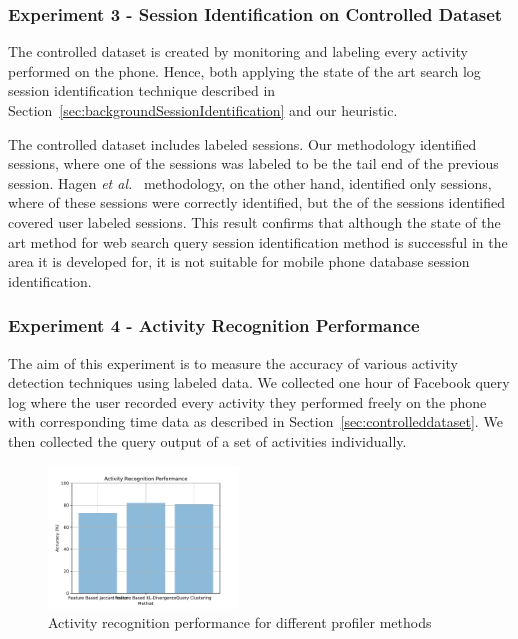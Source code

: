 \subsubsection{Experiment 3 - Session Identification on Controlled Dataset}

The controlled dataset is created by monitoring and labeling every activity performed on the phone. Hence, both applying the state of the art search log session identification technique described in Section~\ref{sec:backgroundSessionIdentification} and our heuristic. 

The controlled dataset includes  labeled sessions. Our methodology identified  sessions, where one of the sessions was labeled to be the tail end of the previous session. Hagen \textit{et al.}~\cite{hagen2011query} methodology, on the other hand, identified only  sessions, where  of these sessions were correctly identified, but the  of the sessions identified covered  user labeled sessions. This result confirms that although the state of the art method for web search query session identification method is successful in the area it is developed for, it is not suitable for mobile phone database session identification. 

\subsubsection{Experiment 4 - Activity Recognition Performance}
The aim of this experiment is to measure the accuracy of various activity detection techniques using labeled data. We collected one hour of Facebook query log where the user recorded every activity they performed freely on the phone with corresponding time data as described in Section~\ref{sec:controlleddataset}. We then collected the query output of a set of activities individually.

\begin{figure}[h!]
    \centering
    \includegraphics[width=0.45\textwidth]{graphics/activityRecognition}
    \caption{Activity recognition performance for different profiler methods }
    \label{fig:activityRecognition}
\end{figure}

